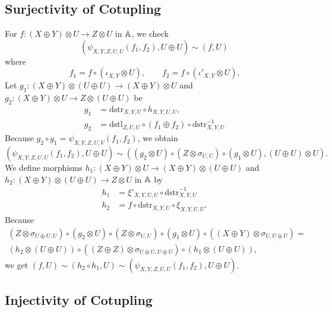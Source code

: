 \subsection{Surjectivity of Cotupling}

For $f \colon (X \oplus Y) \otimes U \to Z \otimes U$ in $\mathbb{A}$,
we check
\begin{equation*}
  (\psi_{X,Y,Z,U,U}(f_{1}, f_{2}), U \oplus U) \sim (f,U)
\end{equation*}
where
\begin{equation*}
  f_{1} = f \circ (\iota_{X,Y} \otimes U), \qquad
  f_{2} = f \circ (\iota'_{X,Y} \otimes U).
\end{equation*}
Let $g_{1} \colon (X \oplus Y) \otimes (U \oplus U) \to (X \oplus Y) \otimes U$
and $g_{2} \colon (X \oplus Y) \otimes U \to Z \otimes (U \oplus U)$ be
\begin{align*}
  g_{1} &= \mathrm{dstr}_{X,Y,U} \circ h_{X,Y,U,U}, \\
  g_{2} &= \mathrm{dstl}_{Z,U,U} \circ (f_{1} \oplus f_{2}) \circ \mathrm{dstr}_{X,Y,U}^{-1}
\end{align*}
Because $g_{2} \circ g_{1} = \psi_{X,Y,Z,U,V}(f_{1},f_{2})$, we obtain
\begin{equation*}
  (\psi_{X,Y,Z,U,U}(f_{1}, f_{2}), U \oplus U)
  \sim ((g_{2} \otimes U) \circ (Z \otimes \sigma_{U,U}) \circ (g_{1} \otimes U),
  (U \oplus U) \otimes U).
\end{equation*}
We define morphisms $h_{1} \colon (X \oplus Y) \otimes U \to (X \oplus Y) \otimes (U \oplus U)$
and $h_{2} \colon (X \oplus Y) \otimes (U \oplus U) \to Z \otimes U$ in $\mathbb{A}$ by
\begin{align*}
  h_{1} &= \xi'_{X,Y,U,U} \circ \mathrm{dstr}_{X,Y,U}^{-1} \\
  h_{2} &= f \circ \mathrm{dstr}_{X,Y,U} \circ \xi_{X,Y,U,U}.
\end{align*}
Because
\begin{multline*}
  (Z \otimes \sigma_{U \oplus U,U}) \circ
  (g_{2} \otimes U) \circ (Z \otimes \sigma_{U,U}) \circ (g_{1} \otimes U)
  \circ ((X \oplus Y) \otimes \sigma_{U,U \oplus U})
  = \\
  (h_{2} \otimes (U \oplus U)) \circ ((Z \oplus Z) \otimes \sigma_{U \oplus U,U \oplus U})
  \circ (h_{1} \otimes (U \oplus U)),
\end{multline*}
we get $(f,U) \sim (h_{2} \circ h_{1},U) \sim (\psi_{X,Y,Z,U,U}(f_{1},f_{2}),U \oplus U)$.

\subsection{Injectivity of Cotupling}

